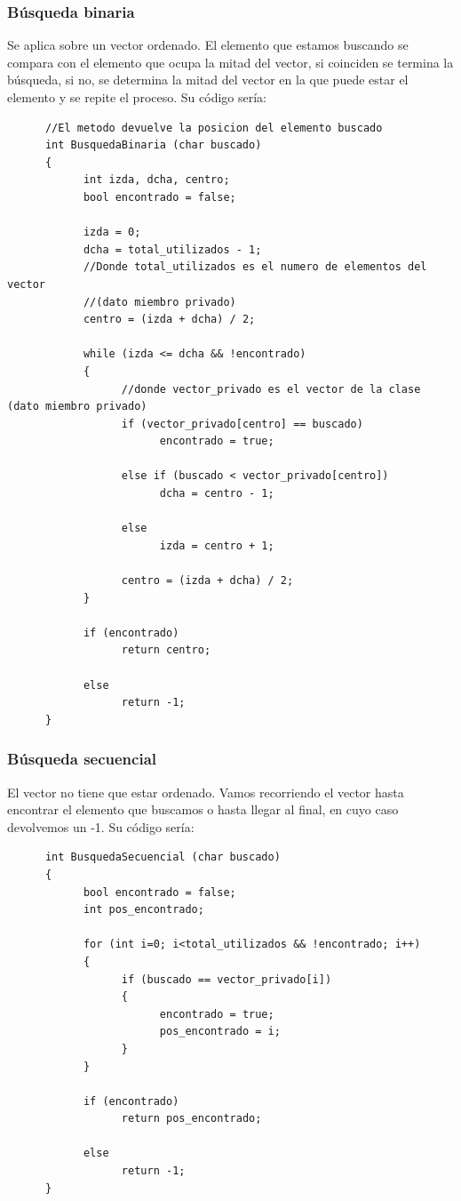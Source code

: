 \documentclass[10pt,a4paper,spanish]{report}
\begin{document}
                  \subsubsection{\textcolor[rgb]{0.5,0.8,0.1}Búsqueda binaria}
                  \noindent
                        Se aplica sobre un vector ordenado. El elemento que estamos buscando se compara con el elemento que ocupa la mitad del vector, si coinciden se termina la búsqueda, si no, se determina la mitad del vector en la que puede estar el elemento y se repite el proceso.
                        \noindent
                        Su código sería:
      \begin{verbatim}
      //El metodo devuelve la posicion del elemento buscado
      int BusquedaBinaria (char buscado)
      {
            int izda, dcha, centro;
            bool encontrado = false;

            izda = 0;
            dcha = total_utilizados - 1;
            //Donde total_utilizados es el numero de elementos del vector
            //(dato miembro privado)
            centro = (izda + dcha) / 2;

            while (izda <= dcha && !encontrado)
            {
                  //donde vector_privado es el vector de la clase (dato miembro privado)
                  if (vector_privado[centro] == buscado)
                        encontrado = true;

                  else if (buscado < vector_privado[centro])
                        dcha = centro - 1;

                  else
                        izda = centro + 1;

                  centro = (izda + dcha) / 2;
            }

            if (encontrado)
                  return centro;

            else
                  return -1;
      }
      \end{verbatim}
                  \subsubsection{\textcolor[rgb]{0.5,0.8,0.1}Búsqueda secuencial}
                  \noindent
                        El vector no tiene que estar ordenado. Vamos recorriendo el vector hasta encontrar el elemento que buscamos o hasta llegar al final, en cuyo caso devolvemos un -1.
                        \noindent
                        Su código sería:
      \begin{verbatim}
      int BusquedaSecuencial (char buscado)
      {
            bool encontrado = false;
            int pos_encontrado;

            for (int i=0; i<total_utilizados && !encontrado; i++)
            {
                  if (buscado == vector_privado[i])
                  {
                        encontrado = true;
                        pos_encontrado = i;
                  }
            }

            if (encontrado)
                  return pos_encontrado;

            else
                  return -1;
      }
      \end{verbatim}
\end{document}
